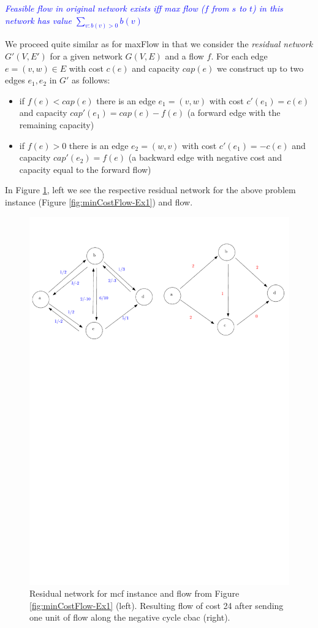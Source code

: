 \documentclass{article}
\begin{document}
\textcolor{blue}{\emph{Feasible flow in original network exists iff max flow ($f$ from $s$ to $t$) in this network has value $\sum_{v:b(v)>0} b(v)$}}

We proceed quite similar as for maxFlow in that we consider the \emph{residual network} $G'(V,E')$ for a given network $G(V,E)$ and a flow $f$. For each edge $e=(v,w)\in E$ with cost $c(e)$ and capacity $cap(e)$ we construct up to two edges $e_1, e_2$ in $G'$ as follows:
\begin{itemize}
\item if $f(e)<cap(e)$ there is an edge $e_1=(v,w)$ with cost $c'(e_1)=c(e)$ and capacity $cap'(e_1)=cap(e)-f(e)$
	(a forward edge with the remaining capacity)
\item if $f(e)>0$ there is an edge $e_2=(w,v)$ with cost $c'(e_1)=-c(e)$ and capacity $cap'(e_2)=f(e)$ (a backward edge with negative cost and capacity equal to the forward flow)
\end{itemize}

In Figure \ref{fig:minCostFlow-Ex1-residual}, left we see the respective residual network for the above problem instance (Figure \ref{fig:minCostFlow-Ex1}) and flow. 

\begin{figure}
\includegraphics[width=\textwidth]{Figs/minCostFlow-Ex1-residual3}
\caption{Residual network for mcf instance and flow from Figure \ref{fig:minCostFlow-Ex1} (left). Resulting flow of cost 24 after sending one unit of flow along the negative cycle cbac (right).}\label{fig:minCostFlow-Ex1-residual}
\end{figure}
\end{document}
